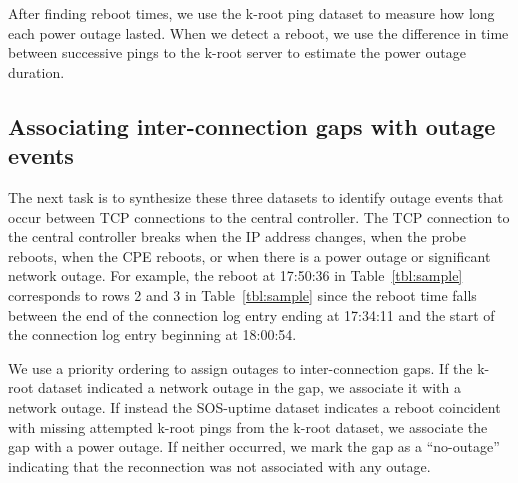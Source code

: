 After finding reboot times, we use the k-root ping dataset
to measure how long each power outage lasted. 
 When we detect a reboot, we use the difference in time between
successive pings to the k-root server to estimate the power outage duration. 

\subsection{Associating inter-connection gaps with outage events}

The next task is to synthesize these three datasets to
identify outage events that occur between TCP connections to
the central controller.  The TCP connection to the central
controller breaks when the IP address changes, when the
probe reboots, when the CPE reboots, or when there is a
power outage or significant network outage.  For example,
the reboot at 17:50:36 in Table~\ref{tbl:sample} corresponds
to rows 2 and 3 in Table~\ref{tbl:sample} since the reboot
time falls between the end of the connection log entry
ending at 17:34:11 and the start of the connection log entry
beginning at 18:00:54.

We use a priority ordering to assign outages to inter-connection gaps.
If the k-root dataset indicated a network outage in the gap, we associate
it with a network outage.  If instead the SOS-uptime dataset indicates a
reboot coincident with missing attempted k-root pings from the k-root
dataset, we associate the gap with a power outage.  If neither occurred,
we mark the gap as a ``no-outage'' indicating that the reconnection was
not associated with any outage.

